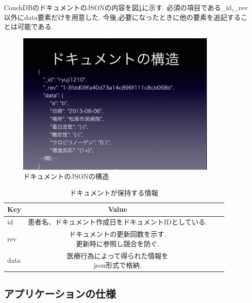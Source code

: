 	CouchDBのドキュメントのJSONの内容を図\ref{json-for-doc}に示す.
	必須の項目である\_id,\_rev以外にdata要素だけを用意した.
	今後,必要になったときに他の要素を追記することは可能である.


	\begin{figure}[htbp]
		\begin{center}
			\includegraphics[width=10cm, bb=0 0 1027 737]{./gazou/json-for-doc.png}
		\end{center}
		\caption{ドキュメントのJSONの構造}
		\label{json-for-doc}
	\end{figure}


	\begin{table}[htb]
		\begin{center}
			\caption{ドキュメントが保持する情報}
			\begin{tabular}{|l|c|r|r|}\hline
			Key & Value \\ \hline \hline
			id &  患者名、ドキュメント作成日をドキュメントIDとしている. \\ \hline
			rev & \shortstack{ドキュメントの更新回数を示す. \\ 更新時に参照し競合を防ぐ.} \\ \hline
			data & \shortstack{医療行為によって得られた情報を \\ json形式で格納.} \\ \hline
			\end{tabular}
			\label{tab:doc}
		\end{center}
	\end{table}


\subsection{アプリケーションの仕様}

